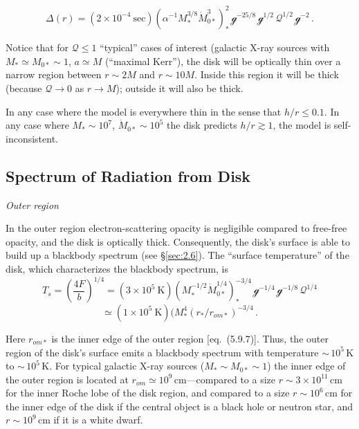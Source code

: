 \[
\Delta(r) = (2 \times 10^{-4}~\text{sec})(\alpha^{-1}M_*^{3/8}\dot{M}_{0*}^{3})_*^{2}\,\mathscr{g}^{-25/8}\,\mathscr{g}^{1/2}\,\mathscr{Q}^{1/2}\,\mathscr{g}^{-2}\,.
\]

Notice that for $\mathscr{Q} \leq 1$ ``typical'' cases of interest (galactic X-ray sources with
$M_* \simeq M_{0*} \sim 1$, $a \simeq M$ (``maximal
Kerr''), the disk will be optically thin over a narrow region between $r \sim 2M$ and
$r \sim 10M$.  Inside this region it will be thick (because $\mathscr{Q} \to 0$ as $r \to M$); outside it
will also be thick.

In any case where the model
is everywhere thin in the sense that $h/r \leq 0.1$.  In any case where $M_* \sim 10^7$, $\dot{M}_{0*} \sim 10^5$ the disk
predicts $h/r \gtrsim 1$, the model is self-inconsistent.


\subsection{Spectrum of Radiation from Disk}
\label{sec:5.10}

\noindent
\textit{Outer region}

In the outer region electron-scattering opacity is negligible compared to free-free
opacity, and the disk is optically thick.  Consequently, the disk's surface
is able to build up a blackbody spectrum (see \S\ref{sec:2.6}).  The ``surface temperature''
of the disk, which characterizes the blackbody spectrum, is
%
\begin{equation}
\tag{5.10.1}
T_s = \left(\frac{4F}{b}\right)^{1/4}
= (3 \times 10^5~\text{K})(M_*^{-1/2}\dot{M}_{0*}^{1/4})_*^{-3/4}\,
\mathscr{g}^{-1/4}\,\mathscr{g}^{-1/8}\,\mathscr{Q}^{1/4}
\end{equation}
%
\[
\simeq (1 \times 10^5~\text{K})(M_*^{4}(r_*/r_{om*})^{-3/4}\,.
\]

Here $r_{om*}$ is the inner edge of the outer region [eq.\ (5.9.7)].  Thus, the outer
region of the disk's surface emits a blackbody spectrum with temperature
${\sim}\,10^5$\,K to ${\sim}\,10^5$\,K.  For typical galactic X-ray sources ($M_* \sim M_{0*} \sim 1$) the
inner edge of the outer region is located at $r_{om} \simeq 10^9$\,cm---compared to a size
$r \sim 3 \times 10^{11}$\,cm for the inner Roche lobe of the disk region, and compared to a size
$r \sim 10^6$\,cm for the inner edge of the disk if the central object is a black
hole or neutron star, and $r \sim 10^9$\,cm if it is a white dwarf.


